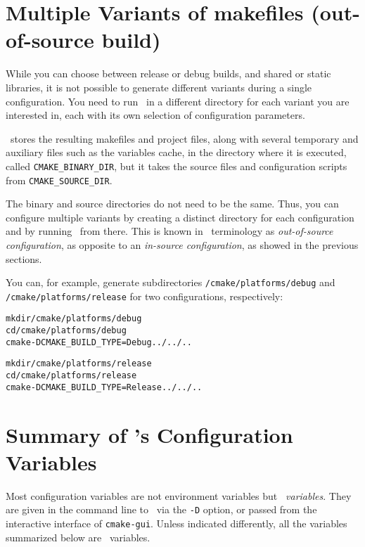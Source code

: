 
\section{Multiple Variants of makefiles (out-of-source build)}\label{sec:cmake-out-of-source}

While you can choose between release or debug builds, and shared or static libraries,
it is not possible to generate different variants during a single configuration. You need to run \cmake\ in a 
different directory for each variant you are interested in, each with its own selection of configuration parameters.

\cmake\ stores the resulting makefiles and project files, along with several temporary and auxiliary files such
as the variables cache, in the directory where it is executed, called \texttt{CMAKE\_BINARY\_DIR}, but it
takes the source files and configuration scripts from
\texttt{CMAKE\_SOURCE\_DIR}.

The binary and source directories do not need to be the same. Thus, you can configure multiple variants by creating a
distinct directory for each configuration and by running \cmake\ from there. This is known in \cmake\ terminology
as  \emph{out-of-source configuration}, as opposite to an \emph{in-source
  configuration}, as showed in the previous sections.

You can, for example, generate subdirectories \cgalrel{}\texttt{/cmake/platforms/debug} and 
\cgalrel{}\texttt{/cmake/platforms/release} for two configurations, respectively:

{\ccTexHtml{}{}
\begin{alltt}
mkdir \cgalrel/cmake/platforms/debug
cd \cgalrel/cmake/platforms/debug
cmake -DCMAKE_BUILD_TYPE=Debug ../../..

mkdir \cgalrel/cmake/platforms/release
cd \cgalrel/cmake/platforms/release
cmake -DCMAKE_BUILD_TYPE=Release ../../..
\end{alltt}
}




\section{Summary of \cgal's Configuration Variables}

Most configuration variables are not environment variables but \emph{\cmake\ variables}. They are given in the command line to \cmake\ via the \texttt{-D} option, 
or passed from the interactive interface of \texttt{cmake-gui}. Unless
indicated differently, all the variables summarized below are \cmake\ variables.

